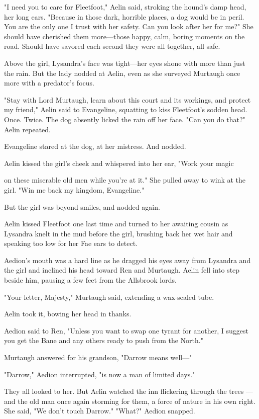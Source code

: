 "I need you to care for Fleetfoot," Aelin said, stroking the hound's damp head, her long ears. "Because in those dark, horrible places, a dog would be in peril. You are the only one I trust with her safety. Can you look after her for me?" She should have cherished them more---those happy, calm, boring moments on the road. Should have savored each second they were all together, all safe.

Above the girl, Lysandra's face was tight---her eyes shone with more than just the rain. But the lady nodded at Aelin, even as she surveyed Murtaugh once more with a predator's focus.

"Stay with Lord Murtaugh, learn about this court and its workings, and protect my friend," Aelin said to Evangeline, squatting to kiss Fleetfoot's sodden head. Once. Twice. The dog absently licked the rain off her face. "Can you do that?" Aelin repeated.

Evangeline stared at the dog, at her mistress. And nodded.

Aelin kissed the girl's cheek and whispered into her ear, "Work your magic

on these miserable old men while you're at it." She pulled away to wink at the girl. "Win me back my kingdom, Evangeline."

But the girl was beyond smiles, and nodded again.

Aelin kissed Fleetfoot one last time and turned to her awaiting cousin as Lysandra knelt in the mud before the girl, brushing back her wet hair and speaking too low for her Fae ears to detect.

Aedion's mouth was a hard line as he dragged his eyes away from Lysandra and the girl and inclined his head toward Ren and Murtaugh. Aelin fell into step beside him, pausing a few feet from the Allsbrook lords.

"Your letter, Majesty," Murtaugh said, extending a wax-sealed tube.

Aelin took it, bowing her head in thanks.

Aedion said to Ren, "Unless you want to swap one tyrant for another, I suggest you get the Bane and any others ready to push from the North."

Murtaugh answered for his grandson, "Darrow means well---"

"Darrow," Aedion interrupted, "is now a man of limited days."

They all looked to her. But Aelin watched the inn flickering through the trees ---and the old man once again storming for them, a force of nature in his own right. She said, "We don't touch Darrow." "What?" Aedion snapped.

